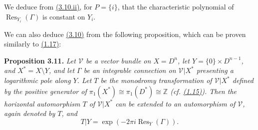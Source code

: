 \documentclass{report}
\newenvironment{itenv}[1]
  {\phantomsection\par\medskip\noindent\textbf{#1.}\itshape}
  {\medskip}
\renewcommand{\cal}[1]{{\mathcal{#1}}}
\newcommand{\ZZ}{\mathbb{Z}}
\DeclareMathOperator{\Res}{Res}
\begin{document}
We deduce from \hyperref[II.3.10]{(3.10.ii)}, for $P=\{i\}$, that the characteristic polynomial of $\Res_{Y_i}(\Gamma)$ is constant on $Y_i$.

We can also deduce \hyperref[II.3.10]{(3.10)} from the following proposition, which can be proven similarly to \hyperref[II.1.17]{(1.17)}:

\begin{itenv}{Proposition 3.11}
\label{II.3.11}
  Let $\cal{V}$ be a vector bundle on $X=D^n$, let $Y=\{0\}\times D^{n-1}$, and $X^*=X\setminus Y$, and let $\Gamma$ be an integrable connection on $\cal{V}|X^*$ presenting a logarithmic pole along $Y$.
  Let $T$ be the monodromy transformation of $\cal{V}|X^*$ defined by the positive generator of $\pi_1(X^*)\cong\pi_1(D^*)\cong\ZZ$ (cf. \hyperref[II.1.15]{(1.15)}).
  Then the horizontal automorphism $T$ of $\cal{V}|X^*$ can be extended to an automorphism of $\cal{V}$, again denoted by $T$, and
  \[
    T|Y = \exp(-2\pi i\Res_Y(\Gamma)).
  \]
\end{itenv}
\end{document}
